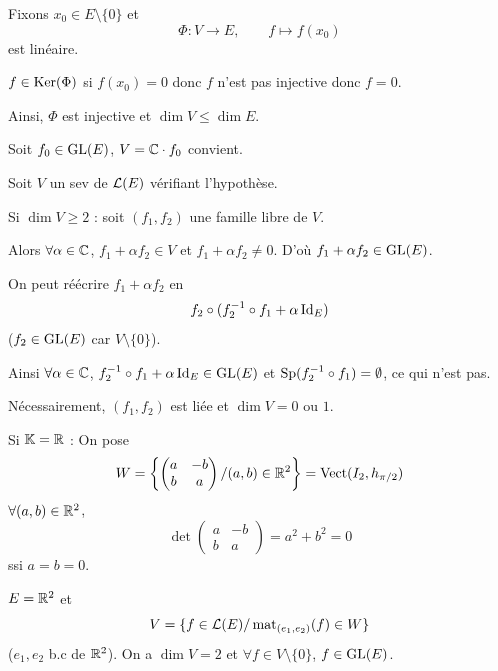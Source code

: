 \begin{solution}
Fixons $x_0\in E\setminus\{0\}$ et
\[
\Phi:V\to E,\qquad f\mapsto f(x_0)
\]
est linéaire.

$f\in\operatorname{Ker}(\Phi)$ si $f(x_0)=0$ donc $f$ n'est pas injective donc $f=0$.

Ainsi, $\Phi$ est injective et $\boxed{\dim V\leq \dim E}$.

Soit $f_0\in\operatorname{GL}(E)$, $V=\mathbb C\cdot f_0$ convient.

Soit $V$ un sev de $\mathcal L(E)$ vérifiant l'hypothèse.

Si $\dim V\geq 2$ : soit $(f_1,f_2)$ une famille libre de $V$.

Alors $\forall \alpha\in\mathbb C$, $f_1+\alpha f_2\in V$ et
$f_1+\alpha f_2\neq0$. D'où $f_1+\alpha f_2\in\operatorname{GL}(E)$.

On peut réécrire $f_1+\alpha f_2$ en
\[
f_2\circ(f_2^{-1}\circ f_1+\alpha \operatorname{Id}_E)
\]
($f_2\in\operatorname{GL}(E)$ car $V\setminus\{0\}$).

Ainsi $\forall \alpha\in\mathbb C$, $f_2^{-1}\circ f_1+\alpha\operatorname{Id}_E\in\operatorname{GL}(E)$ et
$\operatorname{Sp}(f_2^{-1}\circ f_1)=\emptyset$, ce qui n'est pas.

Nécessairement, $(f_1,f_2)$ est liée et $\dim V=0$ ou $1$.

Si $\mathbb K=\mathbb R$ : On pose
\[
W=\left\{\begin{pmatrix}a&-b\\ b&a\end{pmatrix}/(a,b)\in\mathbb R^2\right\}
=\operatorname{Vect}(I_2,h_{\pi/2})
\]
$\forall(a,b)\in\mathbb R^2$,
\[
\det\begin{pmatrix}a&-b\\ b&a\end{pmatrix}=a^2+b^2=0
\]
ssi $a=b=0$.

\begin{remarkbox}
$E=\mathbb R^2$ et
\[
V=\{f\in\mathcal L(E)/\operatorname{mat}_{(e_1,e_2)}(f)\in W\}
\]
($e_1,e_2$ b.c de $\mathbb R^2$). On a $\dim V=2$ et $\forall f\in V\setminus\{0\}$,
$f\in\operatorname{GL}(E)$.
\end{remarkbox}
\end{solution}


